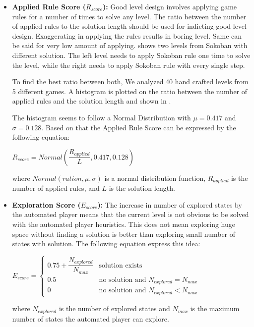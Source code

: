 \begin{itemize}
	\item \textbf{Applied Rule Score ($R_{score}$):} Good level design involves applying game rules for a number of times to solve any level. The ratio between the number of applied rules to the solution length should be used for indicting good level design. Exaggerating in applying the rules results in boring level. Same can be said for very low amount of applying.  shows two levels from Sokoban with different solution. The left level needs to apply Sokoban rule one time to solve the level, while the right needs to apply Sokoban rule with every single step.
	
	
	To find the best ratio between both, We analyzed 40 hand crafted levels from 5 different games. A histogram is plotted on the ratio between the number of applied rules and the solution length and shown in .
	
	
	The histogram seems to follow a Normal Distribution with $\mu = 0.417$ and $\sigma = 0.128$. Based on that the Applied Rule Score can be expressed by the following equation:
	\begin{center}$R_{score} = Normal(\dfrac{R_{applied}}{L}, 0.417, 0.128)$\end{center}
	where $Normal(ration, \mu, \sigma)$ is a normal distribution function, $R_{applied}$ is the number of applied rules, and $L$ is the solution length.
	
	\item \textbf{Exploration Score ($E_{score}$):} The increase in number of explored states by the automated player means that the current level is not obvious to be solved with the automated player heuristics. This does not mean exploring huge space without finding a solution is better than exploring small number of states with solution. The following equation express this idea:
	\begin{center}
	$E_{score}= \begin{cases}
	               0.75 + \dfrac{N_{explored}}{N_{max}} & \text{solution exists}\\
	               0.5 & \text{no solution and }N_{explored} = N_{max}\\
	               0 & \text{no solution and }N_{explored} < N_{max}
	           \end{cases}$
	\end{center}
	where $N_{explored}$ is the number of explored states and $N_{max}$ is the maximum number of states the automated player can explore.
\end{itemize}

